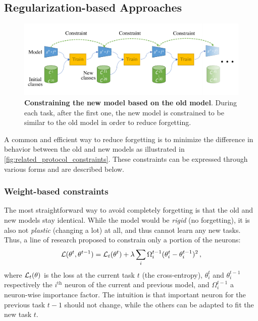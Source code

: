 \subsection{Regularization-based Approaches}
\label{sec:related_regul}


\begin{figure}[tb]
      \begin{center}
            \includegraphics[width=1.0\linewidth]{images/related/constraints}
      \end{center}
      \caption{\textbf{Constraining the new model based on the old model}. During each task, after
            the first one, the new model is constrained to be similar to the old model in order to reduce
            forgetting.}
      \label{fig:related_protocol_constraints}
\end{figure}

A common and efficient way to reduce forgetting is to minimize the difference in behavior between
the old and new models as illustrated in \autoref{fig:related_protocol_constraints}. These constraints can be
expressed through various forms and are described below.

\subsubsection{Weight-based constraints}
\label{sec:related_regul_weight}


The most straightforward way to avoid completely forgetting is that the old and new models stay
identical. While the model would be \textit{rigid} (no forgetting), it is also not \textit{plastic}
(changing a lot) at all, and thus cannot learn any new tasks. Thus, a line of research proposed to
constrain only a portion of the neurons:
%
\begin{equation}
      \mathcal{L}(\theta^t, \theta^{t-1}) = \mathcal{L}_t(\theta^t) + \lambda \sum_i \Omega_i^{t-1} (\theta^t_i - \theta_i^{t-1})^2\,,
      \label{eq:related_weight_constraint}
\end{equation}
%
where $\mathcal{L}_t(\theta)$ is the loss at the current task $t$ (\eg the cross-entropy), $\theta_i^t$
and $\theta_i^{t-1}$ respectively the $i^\text{th}$ neuron of the current and previous model, and
$\Omega_i^{t-1}$ a neuron-wise importance factor. The intuition is that important neuron for the
previous task $t-1$ should not change, while the others can be adapted to fit the new task $t$.

